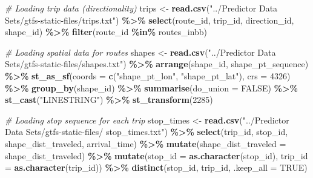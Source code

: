 \documentclass[
  12pt,
]{article}
\newenvironment{Shaded}{\begin{snugshade}}{\end{snugshade}}
\newcommand{\AttributeTok}[1]{\textcolor[rgb]{0.13,0.29,0.53}{#1}}
\newcommand{\CommentTok}[1]{\textcolor[rgb]{0.56,0.35,0.01}{\textit{#1}}}
\newcommand{\ConstantTok}[1]{\textcolor[rgb]{0.56,0.35,0.01}{#1}}
\newcommand{\DecValTok}[1]{\textcolor[rgb]{0.00,0.00,0.81}{#1}}
\newcommand{\FunctionTok}[1]{\textcolor[rgb]{0.13,0.29,0.53}{\textbf{#1}}}
\newcommand{\NormalTok}[1]{#1}
\newcommand{\OtherTok}[1]{\textcolor[rgb]{0.56,0.35,0.01}{#1}}
\newcommand{\SpecialCharTok}[1]{\textcolor[rgb]{0.81,0.36,0.00}{\textbf{#1}}}
\newcommand{\StringTok}[1]{\textcolor[rgb]{0.31,0.60,0.02}{#1}}
\begin{document}
\begin{Shaded}
\begin{Highlighting}[]
\CommentTok{\# Loading trip data (directionality)}
\NormalTok{trips }\OtherTok{\textless{}{-}} \FunctionTok{read.csv}\NormalTok{(}\StringTok{"../Predictor Data Sets/gtfs{-}static{-}files/trips.txt"}\NormalTok{) }\SpecialCharTok{\%\textgreater{}\%}
  \FunctionTok{select}\NormalTok{(route\_id, trip\_id, direction\_id, shape\_id) }\SpecialCharTok{\%\textgreater{}\%}
  \FunctionTok{filter}\NormalTok{(route\_id }\SpecialCharTok{\%in\%}\NormalTok{ routes\_inbb)}

\CommentTok{\# Loading spatial data for routes}
\NormalTok{shapes }\OtherTok{\textless{}{-}} \FunctionTok{read.csv}\NormalTok{(}\StringTok{"../Predictor Data Sets/gtfs{-}static{-}files/shapes.txt"}\NormalTok{) }\SpecialCharTok{\%\textgreater{}\%}
  \FunctionTok{arrange}\NormalTok{(shape\_id, shape\_pt\_sequence) }\SpecialCharTok{\%\textgreater{}\%}
  \FunctionTok{st\_as\_sf}\NormalTok{(}\AttributeTok{coords =} \FunctionTok{c}\NormalTok{(}\StringTok{"shape\_pt\_lon"}\NormalTok{, }\StringTok{"shape\_pt\_lat"}\NormalTok{), }\AttributeTok{crs =} \DecValTok{4326}\NormalTok{) }\SpecialCharTok{\%\textgreater{}\%}
  \FunctionTok{group\_by}\NormalTok{(shape\_id) }\SpecialCharTok{\%\textgreater{}\%}
  \FunctionTok{summarise}\NormalTok{(}\AttributeTok{do\_union =} \ConstantTok{FALSE}\NormalTok{) }\SpecialCharTok{\%\textgreater{}\%}
  \FunctionTok{st\_cast}\NormalTok{(}\StringTok{"LINESTRING"}\NormalTok{) }\SpecialCharTok{\%\textgreater{}\%}
  \FunctionTok{st\_transform}\NormalTok{(}\DecValTok{2285}\NormalTok{)}

\CommentTok{\# Loading stop sequence for each trip}
\NormalTok{stop\_times }\OtherTok{\textless{}{-}} \FunctionTok{read.csv}\NormalTok{(}\StringTok{"../Predictor Data Sets/gtfs{-}static{-}files/}
\StringTok{                       stop\_times.txt"}\NormalTok{) }\SpecialCharTok{\%\textgreater{}\%}
  \FunctionTok{select}\NormalTok{(trip\_id, stop\_id, shape\_dist\_traveled, arrival\_time) }\SpecialCharTok{\%\textgreater{}\%}
  \FunctionTok{mutate}\NormalTok{(}\AttributeTok{shape\_dist\_traveled =}\NormalTok{ shape\_dist\_traveled) }\SpecialCharTok{\%\textgreater{}\%} 
  \FunctionTok{mutate}\NormalTok{(}\AttributeTok{stop\_id =} \FunctionTok{as.character}\NormalTok{(stop\_id),}
         \AttributeTok{trip\_id =} \FunctionTok{as.character}\NormalTok{(trip\_id)) }\SpecialCharTok{\%\textgreater{}\%}
  \FunctionTok{distinct}\NormalTok{(stop\_id, trip\_id,}
           \AttributeTok{.keep\_all =} \ConstantTok{TRUE}\NormalTok{)}


\end{Highlighting}
\end{Shaded}
\end{document}
